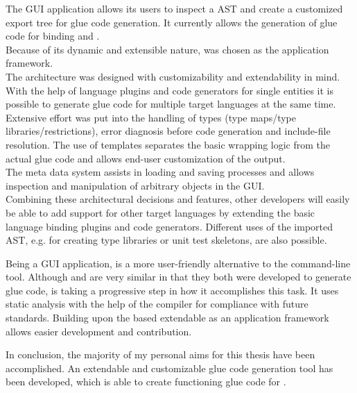 The  GUI application allows its users to inspect a  AST and create a customized export tree for glue code generation. It currently allows the generation of glue code for binding  and .\\
Because of its dynamic and extensible nature,  was chosen as the application framework.\\
The architecture was designed with customizability and extendability in mind. With the help of language plugins and code generators for single  entities it is possible to generate glue code for multiple target languages at the same time. Extensive effort was put into the handling of types (type maps/type libraries/restrictions), error diagnosis before code generation and include-file resolution. The use of templates separates the basic wrapping logic from the actual glue code and allows end-user customization of the output.\\
The meta data system assists in loading and saving processes and allows inspection and manipulation of arbitrary  objects in the GUI.\\
Combining these architectural decisions and features, other developers will easily be able to add support for other target languages by extending the basic language binding plugins and code generators. Different uses of the imported  AST, e.g. for creating type libraries or unit test skeletons, are also possible.

Being a GUI application,  is a more user-friendly alternative to the  command-line tool. Although  and  are very similar in that they both were developed to generate glue code,  is taking a progressive step in how it accomplishes this task. It uses static analysis with the help of the  compiler for compliance with future  standards. Building upon the  based extendable  as an application framework allows easier development and contribution.

In conclusion, the majority of my personal aims for this thesis have been accomplished. An extendable and customizable glue code generation tool has been developed, which is able to create functioning glue code for . 


